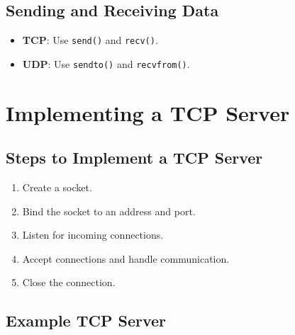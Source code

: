 \documentclass[
  letterpaper,
  DIV=11,
  numbers=noendperiod]{scrreprt}
\providecommand{\tightlist}{%
  \setlength{\itemsep}{0pt}\setlength{\parskip}{0pt}}\usepackage{longtable,booktabs,array}
\begin{document}
\subsection{Sending and Receiving
Data}\label{sending-and-receiving-data-1}

\begin{itemize}
\tightlist
\item
  \textbf{TCP}: Use \texttt{send()} and \texttt{recv()}.
\item
  \textbf{UDP}: Use \texttt{sendto()} and \texttt{recvfrom()}.
\end{itemize}

\section{Implementing a TCP Server}\label{implementing-a-tcp-server}

\subsection{Steps to Implement a TCP
Server}\label{steps-to-implement-a-tcp-server}

\begin{enumerate}
\def\labelenumi{\arabic{enumi}.}
\tightlist
\item
  Create a socket.
\item
  Bind the socket to an address and port.
\item
  Listen for incoming connections.
\item
  Accept connections and handle communication.
\item
  Close the connection.
\end{enumerate}

\subsection{Example TCP Server}\label{example-tcp-server-1}
\end{document}

